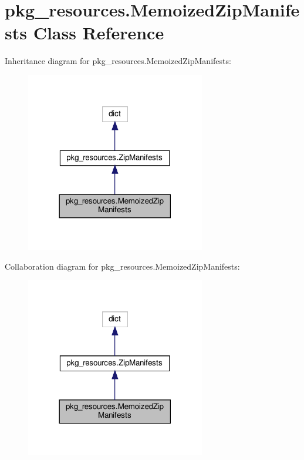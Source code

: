 \hypertarget{classpkg__resources_1_1MemoizedZipManifests}{}\section{pkg\+\_\+resources.\+Memoized\+Zip\+Manifests Class Reference}
\label{classpkg__resources_1_1MemoizedZipManifests}


Inheritance diagram for pkg\+\_\+resources.\+Memoized\+Zip\+Manifests\+:
\nopagebreak
\begin{figure}[H]
\begin{center}
\leavevmode
\includegraphics[width=222pt]{classpkg__resources_1_1MemoizedZipManifests__inherit__graph}
\end{center}
\end{figure}


Collaboration diagram for pkg\+\_\+resources.\+Memoized\+Zip\+Manifests\+:
\nopagebreak
\begin{figure}[H]
\begin{center}
\leavevmode
\includegraphics[width=222pt]{classpkg__resources_1_1MemoizedZipManifests__coll__graph}
\end{center}
\end{figure}
